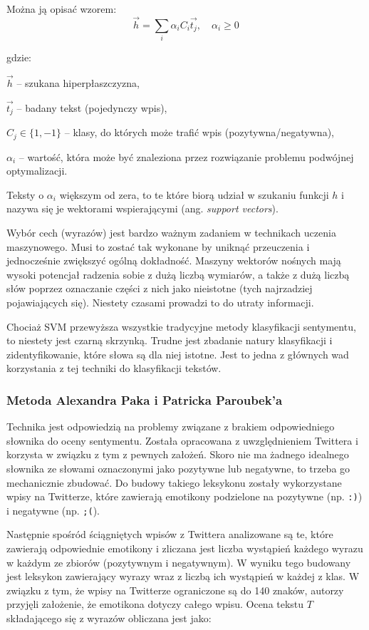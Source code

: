 Można ją opisać wzorem:
\begin{equation}
\vec{h} = \sum\limits_{i}\alpha_iC_i\vec{t_j}, \quad \alpha_i \geq 0
\end{equation}

gdzie:

$\vec{h}$ -- szukana hiperpłaszczyzna,

$\vec{t_j}$ -- badany tekst (pojedynczy wpis),

$C_j \in \{1, -1\}$ -- klasy, do których może trafić wpis (pozytywna/negatywna),

$\alpha_i$ -- wartość, która może być znaleziona przez rozwiązanie problemu
podwójnej optymalizacji.

\bigskip

Teksty o $\alpha_i$ większym od zera, to te które biorą udział
w szukaniu funkcji $h$ i nazywa się je wektorami wspierającymi 
(ang. \textit{support vectors}).

Wybór cech (wyrazów) jest bardzo ważnym zadaniem w technikach uczenia
maszynowego.
Musi to zostać tak wykonane by uniknąć przeuczenia i jednocześnie zwiększyć
ogólną dokładność. Maszyny wektorów nośnych mają wysoki potencjał radzenia sobie
z dużą liczbą wymiarów, a także z dużą liczbą słów poprzez oznaczanie części z
nich jako nieistotne (tych najrzadziej pojawiających się). Niestety czasami
prowadzi to do utraty informacji.

Chociaż SVM przewyższa wszystkie tradycyjne metody klasyfikacji sentymentu,
to niestety jest czarną skrzynką. Trudne jest zbadanie natury klasyfikacji i
zidentyfikowanie, które słowa są dla niej istotne. Jest to jedna z głównych wad
korzystania z tej techniki do klasyfikacji tekstów. 

\subsubsection{Metoda Alexandra Paka i Patricka Paroubek'a}
\label{subsubsection:pakandparoubek}
Technika jest odpowiedzią na problemy związane z brakiem odpowiedniego słownika
do oceny sentymentu. Została opracowana z uwzględnieniem Twittera i korzysta
w związku z tym z pewnych założeń. Skoro nie ma żadnego idealnego słownika
ze słowami oznaczonymi jako pozytywne lub negatywne, to trzeba go mechanicznie
zbudować. Do budowy takiego leksykonu zostały wykorzystane wpisy na Twitterze,
które zawierają emotikony podzielone na pozytywne (np. \texttt{:)}) i 
negatywne (np. \texttt{;(}). 

Następnie spośród ściągniętych wpisów z Twittera analizowane są te,
które zawierają odpowiednie emotikony i zliczana jest liczba wystąpień
każdego wyrazu w każdym ze zbiorów (pozytywnym i negatywnym).
W wyniku tego budowany jest leksykon zawierający wyrazy wraz z liczbą
ich wystąpień w każdej z klas.
W związku z tym, że wpisy na Twitterze ograniczone są do 140 znaków, autorzy przyjęli
założenie, że emotikona dotyczy całego wpisu. 
Ocena tekstu $T$ składającego się z wyrazów obliczana jest jako:

